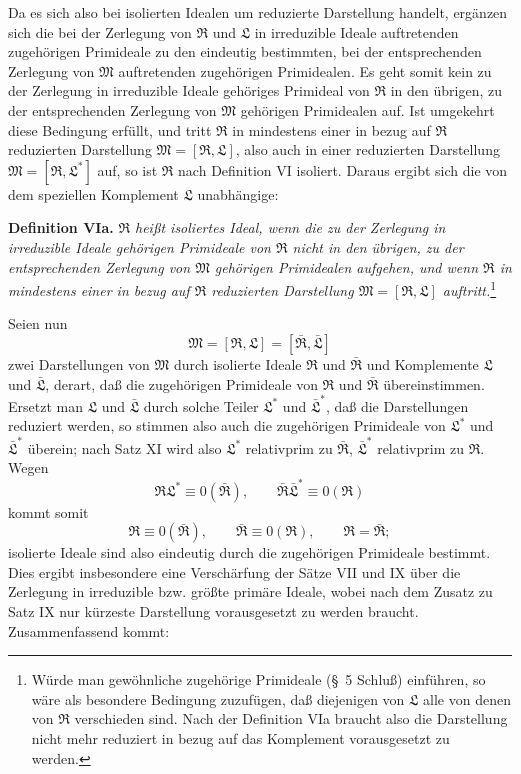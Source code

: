 \documentclass[11pt]{article}
\newcommand{\ideal}[1]{\mathfrak{#1}}
\begin{document}
Da es sich also bei isolierten Idealen um reduzierte Darstellung handelt, ergänzen sich die bei der Zerlegung von $\ideal R$ und $\ideal L$ in irreduzible Ideale auftretenden zugehörigen Primideale zu den eindeutig bestimmten, bei der entsprechenden Zerlegung von $\ideal M$ auftretenden zugehörigen Primidealen. Es geht somit kein zu der Zerlegung in irreduzible Ideale gehöriges Primideal von $\ideal R$ in den übrigen, zu der entsprechenden Zerlegung von $\ideal M$ gehörigen Primidealen auf. Ist umgekehrt diese Bedingung erfüllt, und tritt $\ideal R$ in mindestens einer in bezug auf $\ideal R$ reduzierten Darstellung $\ideal M=[\ideal R,\ideal L]$, also auch in einer reduzierten Darstellung $\ideal M=[\ideal R,\ideal L^*]$ auf, so ist $\ideal R$ nach Definition VI isoliert. Daraus ergibt sich die von dem speziellen Komplement $\ideal L$ unabhängige:

\textbf{Definition VIa.} \emph{$\ideal R$ heißt isoliertes Ideal, wenn die zu der Zerlegung in irreduzible Ideale gehörigen Primideale von $\ideal R$ nicht in den übrigen, zu der entsprechenden Zerlegung von $\ideal M$ gehörigen Primidealen aufgehen, und wenn $\ideal R$ in mindestens einer in bezug auf $\ideal R$ reduzierten Darstellung $\ideal M=[\ideal R,\ideal L]$ auftritt.}\footnote{Würde man gewöhnliche zugehörige Primideale (\S~5 Schluß) einführen, so wäre als besondere Bedingung zuzufügen, daß diejenigen von $\ideal L$ alle von denen von $\ideal R$ verschieden sind. Nach der Definition VIa braucht also die Darstellung nicht mehr reduziert in bezug auf das Komplement vorausgesetzt zu werden.}

Seien nun
\[
 \ideal M=[\ideal R,\ideal L]=[\bar{\ideal R},\bar{\ideal L}]
\]
zwei Darstellungen von $\ideal M$ durch isolierte Ideale $\ideal R$ und $\bar{\ideal R}$ und Komplemente $\ideal L$ und $\bar{\ideal L}$, derart, daß die zugehörigen Primideale von $\ideal R$ und $\bar{\ideal R}$ übereinstimmen. Ersetzt man $\ideal L$ und $\bar{\ideal L}$ durch solche Teiler $\ideal L^*$ und $\bar{\ideal L}^{*}$, daß die Darstellungen reduziert werden, so stimmen also auch die zugehörigen Primideale von $\ideal L^*$ und $\bar{\ideal L}^{*}$ überein; nach Satz XI wird also $\ideal L^*$ relativprim zu $\bar{\ideal R}$, $\bar{\ideal L}^{*}$ relativprim zu $\ideal R$. Wegen
\[
 \ideal R\ideal L^*\equiv0(\bar{\ideal R}),
 \qquad
 \bar{\ideal R}\bar{\ideal L}^{*}\equiv0(\ideal R)
\]
kommt somit
\[
 \ideal R\equiv0(\bar{\ideal R}),
 \qquad
 \bar{\ideal R}\equiv0(\ideal R),
 \qquad
 \ideal R=\bar{\ideal R};
\]
isolierte Ideale sind also eindeutig durch die zugehörigen Primideale bestimmt. Dies ergibt insbesondere eine Verschärfung der Sätze VII und IX über die Zerlegung in irreduzible bzw. größte primäre Ideale, wobei nach dem Zusatz zu Satz IX nur kürzeste Darstellung vorausgesetzt zu werden braucht. Zusammenfassend kommt:
\end{document}
